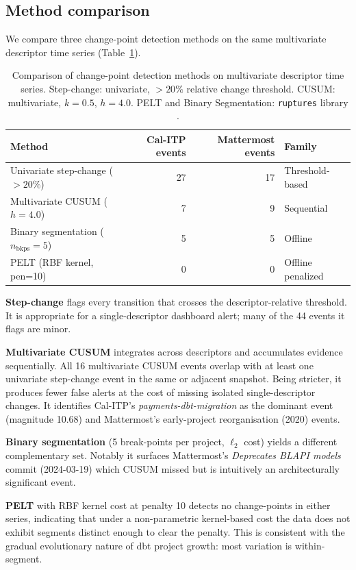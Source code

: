 \documentclass[11pt,a4paper]{article}
\begin{document}
\subsection{Method comparison}

We compare three change-point detection methods on the same multivariate
descriptor time series (Table~\ref{tab:methods}).

\begin{table}[htb]
\centering
\small
\caption{Comparison of change-point detection methods on multivariate
  descriptor time series. Step-change: univariate, $>20\%$ relative
  change threshold. CUSUM: multivariate, $k=0.5$, $h=4.0$. PELT and
  Binary Segmentation: \texttt{ruptures} library
  \citep{truong2020selective}.}
\label{tab:methods}
\begin{tabular}{lrrl}
\toprule
Method & Cal-ITP events & Mattermost events & Family \\
\midrule
Univariate step-change ($>20\%$) & 27 & 17 & Threshold-based \\
Multivariate CUSUM ($h=4.0$) & 7 & 9 & Sequential \\
Binary segmentation ($n_{\text{bkps}}=5$) & 5 & 5 & Offline \\
PELT (RBF kernel, pen=10) & 0 & 0 & Offline penalized \\
\bottomrule
\end{tabular}
\end{table}

\textbf{Step-change} flags every transition that crosses the
descriptor-relative threshold. It is appropriate for a single-descriptor
dashboard alert; many of the 44 events it flags are minor.

\textbf{Multivariate CUSUM} integrates across descriptors and
accumulates evidence sequentially. All 16 multivariate CUSUM events
overlap with at least one univariate step-change event in the same or
adjacent snapshot. Being stricter, it produces fewer false alerts at
the cost of missing isolated single-descriptor changes. It identifies
Cal-ITP's \textit{payments-dbt-migration} as the dominant event
(magnitude 10.68) and Mattermost's early-project reorganisation (2020)
events.

\textbf{Binary segmentation} (5 break-points per project, $\ell_2$ cost)
yields a different complementary set. Notably it surfaces Mattermost's
\textit{Deprecates BLAPI models} commit (2024-03-19) which CUSUM
missed but is intuitively an architecturally significant event.

\textbf{PELT} with RBF kernel cost at penalty 10 detects no
change-points in either series, indicating that under a non-parametric
kernel-based cost the data does not exhibit segments distinct enough to
clear the penalty. This is consistent with the gradual evolutionary
nature of dbt project growth: most variation is within-segment.
\end{document}
